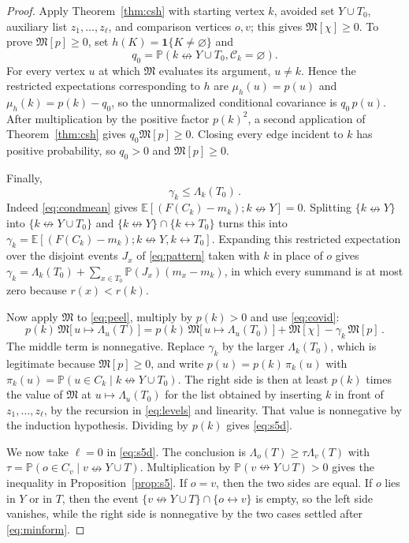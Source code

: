 \documentclass[11pt]{article}
\theoremstyle{definition}
\theoremstyle{remark}
\newcommand{\PP}{\mathbb P}
\newcommand{\EE}{\mathbb E}
\newcommand{\one}{\mathbf 1}
\newcommand{\con}{\leftrightarrow}
\newcommand{\ncon}{\nleftrightarrow}
\newcommand{\eC}{\mathcal C}
\newcommand{\Marg}{\mathfrak M}
\begin{document}
\begin{proof}
Apply Theorem~\ref{thm:csh} with starting vertex $k$, avoided set $Y\cup T_0$, auxiliary
list $z_1,\ldots,z_\ell$, and comparison vertices $o,v$; this gives
$\Marg[\chi]\geq0$. To prove $\Marg[p]\geq0$, set
$h(K)=\one\{K\neq\varnothing\}$ and
\[
 q_0=\PP(k\ncon Y\cup T_0,\eC_k=\varnothing).
\]
For every vertex $u$ at which $\Marg$ evaluates its argument, $u\neq k$. Hence the
restricted expectations corresponding to $h$ are $\mu_h(u)=p(u)$ and
$\mu_h(k)=p(k)-q_0$, so the unnormalized conditional covariance is $q_0\,p(u)$. After multiplication by the positive factor $p(k)^2$, a second
application of Theorem~\ref{thm:csh} gives $q_0\Marg[p]\geq0$. Closing every edge incident
to $k$ has positive probability, so $q_0>0$ and $\Marg[p]\geq0$.

Finally,
\begin{equation}\label{eq:kappa}
 \gamma_k\leq \Lambda_k(T_0)\,.
\end{equation}
Indeed \eqref{eq:condmean} gives $\EE[(F(C_k)-m_k);k\ncon Y]=0$. Splitting $\{k\ncon Y\}$
into $\{k\ncon Y\cup T_0\}$ and $\{k\ncon Y\}\cap\{k\con T_0\}$ turns this into
$\gamma_k=\EE[(F(C_k)-m_k);k\ncon Y,k\con T_0]$. Expanding this restricted expectation over the disjoint
events $J_x$ of \eqref{eq:pattern} taken with $k$ in place of $o$ gives
$\gamma_k=\Lambda_k(T_0)+\sum_{x\in T_0}\PP(J_x)(m_x-m_k)$, in which every summand is at
most zero because $r(x)<r(k)$.

Now apply $\Marg$ to \eqref{eq:peel}, multiply by $p(k)>0$ and use \eqref{eq:covid}:
\[
 p(k)\,\Marg\bigl[\,u\mapsto\Lambda_u(T)\,\bigr]
 =p(k)\,\Marg\bigl[\,u\mapsto\Lambda_u(T_0)\,\bigr]
 +\Marg[\chi]-\gamma_k\,\Marg[p]\,.
\]
The middle term is nonnegative. Replace $\gamma_k$ by the larger $\Lambda_k(T_0)$, which is
legitimate because $\Marg[p]\geq0$, and write $p(u)=p(k)\,\pi_k(u)$ with
$\pi_k(u)=\PP(u\in C_k\mid k\ncon Y\cup T_0)$. The right side is then at least $p(k)$ times the
value of $\Marg$ at $u\mapsto\Lambda_u(T_0)$ for the list obtained by inserting $k$ in
front of $z_1,\dots,z_\ell$, by the recursion in \eqref{eq:levels} and linearity. That
value is nonnegative by the induction hypothesis. Dividing by $p(k)$ gives
\eqref{eq:s5d}.

We now take $\ell=0$ in \eqref{eq:s5d}. The conclusion is $\Lambda_o(T)\geq\tau\Lambda_v(T)$
with $\tau=\PP(o\in C_v\mid v\ncon Y\cup T)$. Multiplication by
$\PP(v\ncon Y\cup T)>0$ gives the inequality in Proposition~\ref{prop:s5}. If $o=v$, then
the two sides are equal. If $o$
lies in $Y$ or in $T$, then the event $\{v\ncon Y\cup T\}\cap\{o\con v\}$ is empty, so the
left side vanishes, while the right side is nonnegative by the two cases settled after
\eqref{eq:minform}.


\end{proof}
\end{document}
